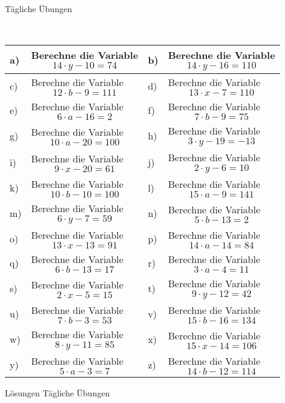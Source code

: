 \documentclass[12pt]{article}
\begin{document}
\centerline{{\Large Tägliche Übungen}} 
\vspace{1cm}
\noindent \\


\begin{xltabular}{\textwidth}{|C{0.75cm}|X|C{0.75cm}|X|}
\hline
a)&Berechne die Variable $$14\cdot y-10=74$$
&
b)&Berechne die Variable $$14\cdot y-16=110$$
\\\hline
c)&Berechne die Variable $$12\cdot b-9=111$$
&
d)&Berechne die Variable $$13\cdot x-7=110$$
\\\hline
e)&Berechne die Variable $$6\cdot a-16=2$$
&
f)&Berechne die Variable $$7\cdot b-9=75$$
\\\hline
g)&Berechne die Variable $$10\cdot a-20=100$$
&
h)&Berechne die Variable $$3\cdot y-19=-13$$
\\\hline
i)&Berechne die Variable $$9\cdot x-20=61$$
&
j)&Berechne die Variable $$2\cdot y-6=10$$
\\\hline
k)&Berechne die Variable $$10\cdot b-10=100$$
&
l)&Berechne die Variable $$15\cdot a-9=141$$
\\\hline
m)&Berechne die Variable $$6\cdot y-7=59$$
&
n)&Berechne die Variable $$5\cdot b-13=2$$
\\\hline
o)&Berechne die Variable $$13\cdot x-13=91$$
&
p)&Berechne die Variable $$14\cdot a-14=84$$
\\\hline
q)&Berechne die Variable $$6\cdot b-13=17$$
&
r)&Berechne die Variable $$3\cdot a-4=11$$
\\\hline
s)&Berechne die Variable $$2\cdot x-5=15$$
&
t)&Berechne die Variable $$9\cdot y-12=42$$
\\\hline
u)&Berechne die Variable $$7\cdot b-3=53$$
&
v)&Berechne die Variable $$15\cdot b-16=134$$
\\\hline
w)&Berechne die Variable $$8\cdot y-11=85$$
&
x)&Berechne die Variable $$15\cdot x-14=106$$
\\\hline
y)&Berechne die Variable $$5\cdot a-3=7$$
&
z)&Berechne die Variable $$14\cdot b-12=114$$
\\\hline
\end{xltabular}
\vspace{0.5cm}
\newpage
{}
\centerline{{\large Lösungen Tägliche Übungen}} 
\vspace{0.5cm}
\end{document}
